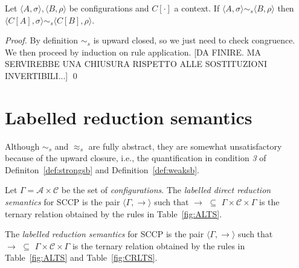 \documentclass{llncs}
\def\C{{\mathcal C}}
\newcommand{\rarrow}{\rightarrow}
\def\C{{\mathcal C}}
\begin{document}
\begin{proposition}
Let $\langle A,\sigma \rangle, \langle B,\rho \rangle$ be configurations
and $C[\cdot]$ a context.
If $\langle A,\sigma \rangle \sim_{\mathit{s}} \langle B,\rho \rangle$
then $\langle C[A],\sigma \rangle \sim_{\mathit{s}} \langle C[B],\rho \rangle$.
%
\end{proposition}
\begin{proof}
By definition $\sim_{\mathit{s}}$ is upward closed, so we just need to check congruence.
We then proceed by induction on rule application.
[DA FINIRE. MA SERVIREBBE UNA CHIUSURA RISPETTO ALLE SOSTITUZIONI INVERTIBILI...]
\qed
\end{proof}



\section{Labelled reduction semantics}

Although $\sim_{\mathit{s}}$ and $\approx_{\mathit{s}}$ are fully abstract, they are somewhat unsatisfactory
because of the upward closure, i.e., the quantification in condition \emph{3} of 
Definiton~\ref{def:strongsb} and Definition~\ref{def:weaksb}.

\begin{definition}
	Let $\Gamma = {\mathcal A} \times \C$ be the set of \emph{configurations}.
	The  \emph{labelled direct reduction semantics} for SCCP is the pair 
	$\langle \Gamma,   \xrightarrow{ }  \rangle$
	such that $\to \, \, \subseteq \, \,\Gamma \times \mathcal{C} \times \Gamma$ is the ternary
	relation obtained by the rules in Table~\ref{fig:ALTS}.
	
	The \emph{labelled reduction semantics} for SCCP is the pair 
	$\langle \Gamma,  \rightarrow \rangle$
	such that $\rarrow \, \, \subseteq \, \,\Gamma \times \mathcal{C} \times  \Gamma$ is the ternary relation
         obtained by the rules in Table~\ref{fig:ALTS} and Table~\ref{fig:CRLTS}.
\end{definition}
\end{document}
